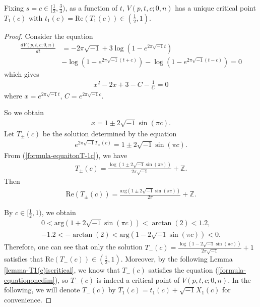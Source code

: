 \documentclass[12pt]{amsart}
\begin{document}
\begin{proposition} \label{prop-critical1}
    Fixing $s=c\in [\frac{1}{2},\frac{3}{4})$, as a function of $t$,  $V(p,t,c;0,n)$ has a unique critical point
    $T_1(c)$ with $t_1(c)=\text{Re}(T_1(c))\in (\frac{1}{2},1)$.     
    \end{proposition} 
\begin{proof}
Consider the equation
\begin{align} \label{formula-equationonedim}
    \frac{dV(p,t,c;0,n)}{dt}&=-2\pi \sqrt{-1}+3\log(1-e^{2\pi\sqrt{-1}t})\\\nonumber
    &-\log(1-e^{2\pi\sqrt{-1}(t+c)})-\log(1-e^{2\pi\sqrt{-1}(t-c)})=0
\end{align}
which gives 
\begin{align}
    x^2-2x+3-C-\frac{1}{C}=0
\end{align}
where $x=e^{2\pi\sqrt{-1}t}$, $C=e^{2\pi\sqrt{-1}c}$.

So we obtain 
\begin{align}
    x=1\pm 2\sqrt{-1}\sin(\pi c). 
\end{align}
Let $T_\pm (c)$ be the solution determined by the equation 
\begin{align} \label{formula-equaitonT-1c}
    e^{2\pi\sqrt{-1}T_\pm (c)}=1\pm 2\sqrt{-1}\sin(\pi c). 
\end{align}
 From (\ref{formula-equaitonT-1c}), we have
\begin{align}
    T_\pm(c)=\frac{\log(1\pm 2\sqrt{-1}\sin(\pi c))}{2\pi\sqrt{-1}} +\mathbb{Z}.
\end{align}
Then 
\begin{align}
    \text{Re}(T_\pm(c))=\frac{\text{arg}(1\pm 2\sqrt{-1}\sin(\pi c))}{2\pi}+\mathbb{Z}. 
\end{align}

By $c\in [\frac{1}{2},1)$, we obtain 
\begin{align}
  0<\text{arg}(1+2\sqrt{-1}\sin(\pi c))<\arctan(2)<1.2, \\\nonumber
  -1.2<-\arctan(2)<\text{arg}(1-2\sqrt{-1}\sin(\pi c))<0. 
\end{align}
Therefore, one can see that only the solution $T_-(c)=\frac{\log(1-2\sqrt{-1}\sin(\pi c))}{2\pi\sqrt{-1}}+1$ satisfies that 
$\text{Re}(T_-(c))\in (\frac{1}{2},1)$. Moreover, by the following Lemma \ref{lemma-T1(c)iscritical}, we know that $T_-(c)$ satisfies the equation (\ref{formula-equationonedim}), so $T_-(c)$ is indeed a critical point of $V(p,t,c;0,n)$.  
In the following, we will denote $T_-(c)$ by $T_1(c)=t_1(c)+\sqrt{-1}X_1(c)$  for convenience.   
\end{proof}
\end{document}
